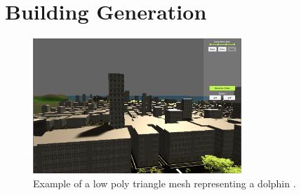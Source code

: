 \section{Building Generation}

\begin{figure}[H]
    \centering
  
    \includegraphics[width=0.7\textwidth]{figure/skyline.PNG}
    \caption{Example of a low poly triangle mesh representing a dolphin \cite{low_poly_dolphin}.}
  
    \label{fig:skyline-result}
  \end{figure}
  


